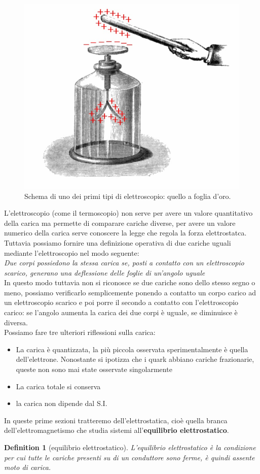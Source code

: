 \documentclass[10pt,a4paper]{article}
\newtheorem{definition}{Definition}
\begin{document}
\begin{figure}[h!]
	\centering
	\includegraphics[width=0.4\linewidth]{images/elettroscopio}
	\caption{Schema di uno dei primi tipi di elettroscopio: quello a foglia d'oro.}
	\label{fig:elettroscopio}
\end{figure}
\FloatBarrier
L'elettroscopio (come il termoscopio) non serve per avere un valore quantitativo della carica ma permette di comparare cariche diverse, per avere un valore numerico della carica serve conoscere la legge che regola la forza elettrostatca. Tuttavia possiamo fornire una definizione operativa di due cariche uguali mediante l'elettroscopio nel modo seguente:\\
\textit{Due corpi possiedono la stessa carica se, posti a contatto con un elettroscopio scarico, generano una deflessione delle foglie di un'angolo uguale}\\
In questo modo tuttavia non si riconosce se due cariche sono dello stesso segno o meno, possiamo verificarlo semplicemente ponendo a contatto un corpo carico ad un elettroscopio scarico e poi porre il secondo a contatto con l'elettroscopio carico: se l'angolo aumenta la carica dei due corpi è uguale, se diminuisce è diversa.\\
Possiamo fare tre ulteriori riflessioni sulla carica:
\begin{itemize}
	\item La carica è quantizzata, la più piccola osservata sperimentalmente è quella dell'elettrone. Nonostante si ipotizza che i quark abbiano cariche frazionarie, queste non sono mai state osservate singolarmente
	\item La carica totale si conserva
	\item la carica non dipende dal S.I.
\end{itemize}
In queste prime sezioni tratteremo dell'elettrostatica, cioè quella branca dell'elettromagnetismo che studia sistemi all'\textbf{equilibrio elettrostatico}.
\begin{definition}[equilibrio elettrostatico]
	L'equilibrio elettrostatico è la condizione per cui tutte le cariche presenti su di un conduttore sono ferme, è quindi assente moto di carica.
\end{definition}
\end{document}
